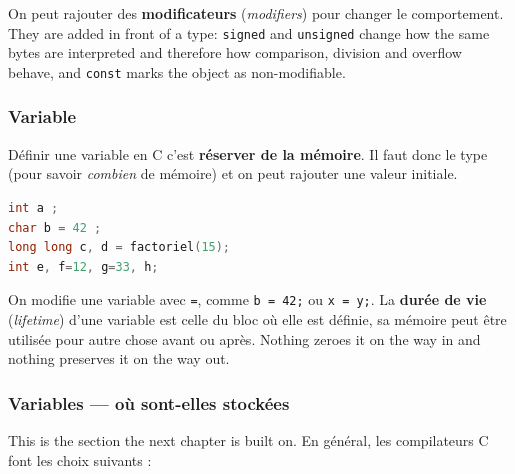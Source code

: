 On peut rajouter des \textbf{modificateurs} (\textit{modifiers}) pour changer le
comportement. They are added in front of a type: \verb|signed| and
\verb|unsigned| change how the same bytes are interpreted and therefore how
comparison, division and overflow behave, and \verb|const| marks the object as
non-modifiable.

\subsubsection{Variable}
\begin{definition}[Variable]
  Définir une variable en C c'est \textbf{réserver de la mémoire}. Il faut donc
  le type (pour savoir \textit{combien} de mémoire) et on peut rajouter une
  valeur initiale.
\end{definition}

\begin{lstlisting}[language=C]
int a ;
char b = 42 ;
long long c, d = factoriel(15);
int e, f=12, g=33, h;
\end{lstlisting}

On modifie une variable avec \verb|=|, comme \verb|b = 42;| ou \verb|x = y;|.
La \textbf{durée de vie} (\textit{lifetime}) d'une variable est celle du bloc
où elle est définie, sa mémoire peut être utilisée pour autre chose avant ou
après. Nothing zeroes it on the way in and nothing preserves it on the way out.

\subsubsection{Variables --- où sont-elles stockées}
This is the section the next chapter is built on. En général, les compilateurs
C font les choix suivants :

